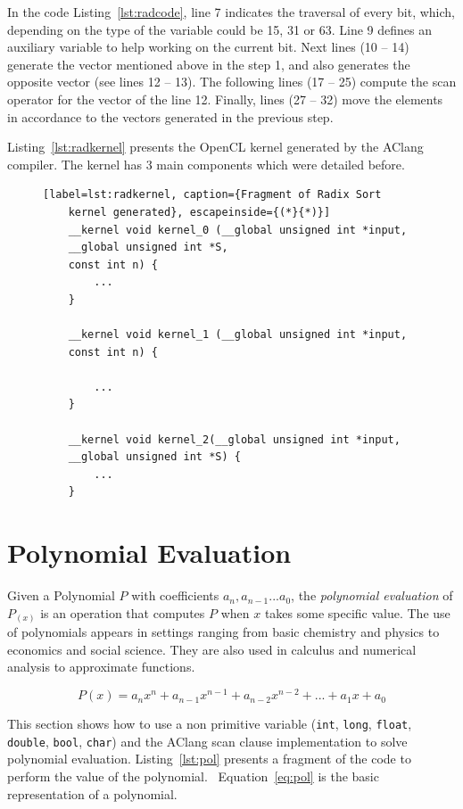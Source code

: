 \documentclass[Ingles]{ic-tese-v1}
\newcommand{\req}[1]{Equation~\ref{eq:#1}}
\newcommand{\ttt}[1]{{\texttt{#1}}}
\newcommand{\rlst}[1]{Listing~\ref{lst:#1}}
\begin{document}
In the code \rlst{radcode}, line 7 indicates the traversal of  every bit,
which, depending on the type of the variable could be 15, 31 or 63. Line 9
defines an auxiliary variable to help working on  the current bit. Next lines
(10 -- 14) generate the vector mentioned above in the step 1, and also
generates the opposite vector (see lines 12 -- 13).  The following lines (17 --
25) compute the scan operator for the vector of the line 12. Finally, lines (27
-- 32) move the elements in accordance to the vectors generated in the previous
step.

\rlst{radkernel} presents the OpenCL kernel generated by the AClang compiler.
The kernel has 3 main components which were detailed before.

\begin{figure}[t]
	\lstset{basicstyle=\scriptsize}
	\begin{lstlisting}[label=lst:radkernel, caption={Fragment of Radix Sort
	kernel generated}, escapeinside={(*}{*)}]
	__kernel void kernel_0 (__global unsigned int *input,
	__global unsigned int *S,
	const int n) {
		...
	}

	__kernel void kernel_1 (__global unsigned int *input,
	const int n) {

		...
	}

	__kernel void kernel_2(__global unsigned int *input,
	__global unsigned int *S) {
		...
	}
	\end{lstlisting}
\end{figure}

\section{Polynomial Evaluation}
\label{sec:PolEval}

Given a Polynomial $P$ with coefficients $a_{n}, a_{n-1} ... a_{0}$, the \textit{polynomial evaluation} of $P_{(x)}$ is an operation
that computes $P$ when $x$ takes some specific value. The use of polynomials
appears in settings ranging from basic chemistry and physics to economics and social science.
They are also used in calculus and numerical analysis to approximate  functions.

\begin{equation}
P(x) = a_{n}x^n + a_{n-1}x^{n-1} + a_{n-2}x^{n-2} + ... + a_{1}x + a_{0}
\label{eq:pol}
\end{equation}

This section shows how to use a non primitive variable (\ttt{int}, \ttt{long}, \ttt{float}, \ttt{double}, \ttt{bool}, \ttt{char})
and the AClang scan clause implementation to solve polynomial evaluation. \rlst{pol} presents
a fragment of the code to perform the value of the polynomial. ~\req{pol} is the basic
representation of a polynomial.
\end{document}
